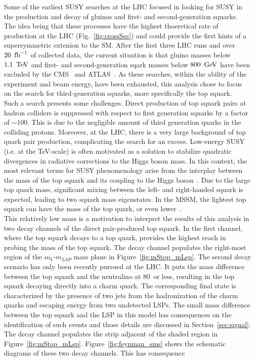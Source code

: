 \indent Some of the earliest SUSY searches at the LHC focused in 
looking for SUSY in the production and decay of gluinos and first- and 
second-generation squarks. The idea being that these processes have the highest 
thoeretical rate of production at the LHC (Fig.~\ref{fig:crossSec}) and could provide the first hints of a 
supersymmetric extenion to the SM. After the first three LHC runs and over $20~\mbox{\ensuremath{\,\text{fb}^\text{$-$1}}}$ of
collected data, the current situation is that gluino masses below $1.1~\,\text{Te\hspace{-.08em}V}$ and first- and 
second-generation sqark masses below $800~\,\text{Ge\hspace{-.08em}V}$ have been excluded by the CMS~\cite{cms-susy} 
and ATLAS~\cite{atlas-susy}. As these searches, within the ability of the experiment and beam energy,
have been exhausted, this analysis chose to focus on the search for third-generation 
squarks, more specifically the top squark.\\
\indent Such a search presents some challenges. Direct production of top squark pairs at hadron 
colliders is suppressed with respect to first generation squarks by a factor of $\sim100$. This is 
due to the negligible amount of third generation quarks in the colliding protons. Moreover, at 
the LHC, there is a very large background of top quark pair production, complicating the search for an excess.
Low-energy SUSY (i.e. at the TeV-scale) is often motivated as a solution to 
stabilize quadratic divergences in radiative corrections to the Higgs boson mass. In this
context, the most relevant terms for SUSY phenomenology arise from the interplay between 
the mass of the top squark and its coupling to the Higgs boson~\cite{Agashe:2014kda}. 
Due to the large top quark mass, significant mixing between the left- and right-handed squark
is expected, leading to two squark mass eigenstates. In the MSSM, the lightest top squark
can have the mass of the top quark, or even lower~\cite{Martin:1997ns}.\\
\indent This relatively low mass is a motivation to interpret the results of this 
analysis in two decay channels of the direct pair-produced top squark. 
In the first channel, where the top squark decays to a top quark, provides the highest reach 
in probing the mass of the top squark. The decay channel populates the right-most region of the 
$m_{\tilde{\rm t}}$-$m_{LSP}$ mass plane in Figure~\ref{fig:mStop_mLsp}.
The second decay scenario has only been recently pursued at the LHC. It puts 
the mass difference between the top squark and the neutralino at 80~\GeV or 
less, resulting in the top squark decaying directly into a charm quark. 
The corresponding final state is characterized by the presence of two jets from 
the hadronization of the charm quarks and escaping energy from two undetected LSPs.
The small mass difference between the top squark and the LSP in this model has consequences on the 
identification of such events and those details are discussed in Section~\ref{sec:signal}.
The decay channel populates the strip adjacent of the shaded region in Figure~\ref{fig:mStop_mLsp}.
Figure~\ref{fig:feynman_sms} shows the schematic diagrams of these two decay channels. This
has consequence


